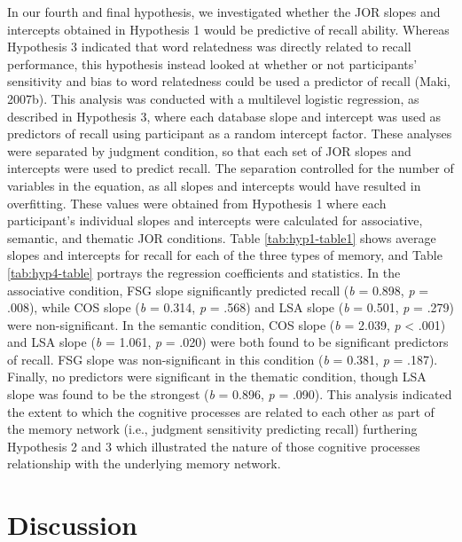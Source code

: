\documentclass[english,man]{apa6}
\theoremstyle{definition}
\theoremstyle{definition}
\theoremstyle{definition}
\theoremstyle{remark}
\begin{document}
In our fourth and final hypothesis, we investigated whether the JOR
slopes and intercepts obtained in Hypothesis 1 would be predictive of
recall ability. Whereas Hypothesis 3 indicated that word relatedness was
directly related to recall performance, this hypothesis instead looked
at whether or not participants' sensitivity and bias to word relatedness
could be used a predictor of recall (Maki, 2007b). This analysis was
conducted with a multilevel logistic regression, as described in
Hypothesis 3, where each database slope and intercept was used as
predictors of recall using participant as a random intercept factor.
These analyses were separated by judgment condition, so that each set of
JOR slopes and intercepts were used to predict recall. The separation
controlled for the number of variables in the equation, as all slopes
and intercepts would have resulted in overfitting. These values were
obtained from Hypothesis 1 where each participant's individual slopes
and intercepts were calculated for associative, semantic, and thematic
JOR conditions. Table \ref{tab:hyp1-table1} shows average slopes and
intercepts for recall for each of the three types of memory, and Table
\ref{tab:hyp4-table} portrays the regression coefficients and
statistics. In the associative condition, FSG slope significantly
predicted recall (\emph{b} = 0.898, \emph{p} = .008), while COS slope
(\emph{b} = 0.314, \emph{p} = .568) and LSA slope (\emph{b} = 0.501,
\emph{p} = .279) were non-significant. In the semantic condition, COS
slope (\emph{b} = 2.039, \emph{p} \textless{} .001) and LSA slope
(\emph{b} = 1.061, \emph{p} = .020) were both found to be significant
predictors of recall. FSG slope was non-significant in this condition
(\emph{b} = 0.381, \emph{p} = .187). Finally, no predictors were
significant in the thematic condition, though LSA slope was found to be
the strongest (\emph{b} = 0.896, \emph{p} = .090). This analysis
indicated the extent to which the cognitive processes are related to
each other as part of the memory network (i.e., judgment sensitivity
predicting recall) furthering Hypothesis 2 and 3 which illustrated the
nature of those cognitive processes relationship with the underlying
memory network.

\section{Discussion}\label{discussion}
\end{document}
